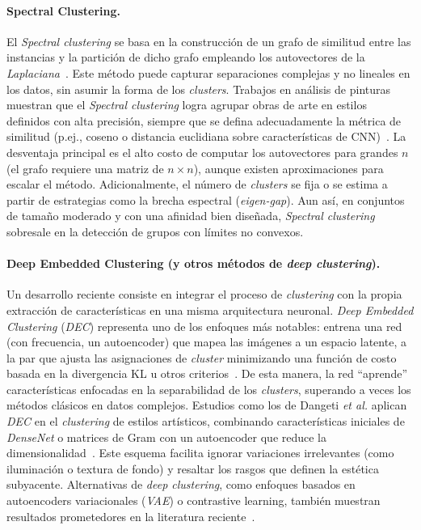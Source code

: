 \paragraph{Spectral Clustering.}
El \textit{Spectral clustering} se basa en la construcción de un grafo de similitud entre las instancias y la partición de dicho grafo empleando los autovectores de la \textit{Laplaciana}~\cite{guerin2018,gultepe2018}.
Este método puede capturar separaciones complejas y no lineales en los datos, sin asumir la forma de los \textit{clusters}.
Trabajos en análisis de pinturas muestran que el \textit{Spectral clustering} logra agrupar obras de arte en estilos definidos con alta precisión, siempre que se defina adecuadamente la métrica de similitud (p.ej., coseno o distancia euclidiana sobre características de CNN)~\cite{gultepe2018}.
La desventaja principal es el alto costo de computar los autovectores para grandes $n$ (el grafo requiere una matriz de $n \times n$), aunque existen aproximaciones para escalar el método.
Adicionalmente, el número de \textit{clusters} se fija o se estima a partir de estrategias como la brecha espectral (\textit{eigen-gap}).
Aun así, en conjuntos de tamaño moderado y con una afinidad bien diseñada, \textit{Spectral clustering} sobresale en la detección de grupos con límites no convexos.

\paragraph{Deep Embedded Clustering (y otros métodos de \textit{deep clustering}).}
Un desarrollo reciente consiste en integrar el proceso de \textit{clustering} con la propia extracción de características en una misma arquitectura neuronal.
\textit{Deep Embedded Clustering} (\textit{DEC}) representa uno de los enfoques más notables: entrena una red (con frecuencia, un autoencoder) que mapea las imágenes a un espacio latente, a la par que ajusta las asignaciones de \textit{cluster} minimizando una función de costo basada en la divergencia KL u otros criterios~\cite{dangeti2024}.
De esta manera, la red “aprende” características enfocadas en la separabilidad de los \textit{clusters}, superando a veces los métodos clásicos en datos complejos.
Estudios como los de Dangeti \textit{et al.} aplican \textit{DEC} en el \textit{clustering} de estilos artísticos, combinando características iniciales de \textit{DenseNet} o matrices de Gram con un autoencoder que reduce la dimensionalidad~\cite{dangeti2024}.
Este esquema facilita ignorar variaciones irrelevantes (como iluminación o textura de fondo) y resaltar los rasgos que definen la estética subyacente.
Alternativas de \textit{deep clustering}, como enfoques basados en autoencoders variacionales (\textit{VAE}) o contrastive learning, también muestran resultados prometedores en la literatura reciente~\cite{parisotto2022}.

